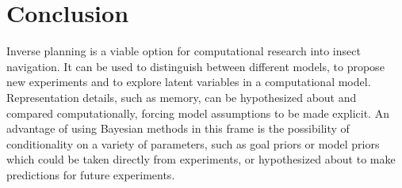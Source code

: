 \section{Conclusion}

Inverse planning is a viable option for computational research into insect navigation.
It can be used to distinguish between different models, to propose new experiments and to explore latent variables in a computational model.
Representation details, such as memory, can be hypothesized about and compared computationally, forcing model assumptions to be made explicit.
An advantage of using Bayesian methods in this frame is the possibility of conditionality on a variety of parameters, such as goal priors or model priors which could be taken directly from experiments, or hypothesized about to make predictions for future experiments.
